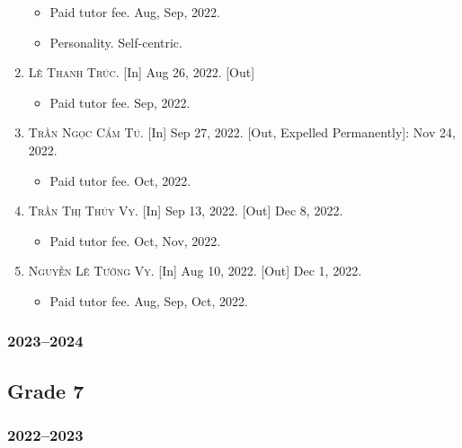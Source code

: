 \documentclass{article}
\begin{document}
\begin{enumerate}
	\begin{itemize}
		\item \textsf{Paid tutor fee.} Aug, Sep, 2022.
		\item \textsf{Personality.} Self-centric.
	\end{itemize}
	\item \textsc{Lê Thanh Trúc.} \textsf{[In]} Aug 26, 2022. \textsf{[Out]}
	\begin{itemize}
		\item \textsf{Paid tutor fee.} Sep, 2022.
	\end{itemize}
	\item \textsc{Trần Ngọc Cẩm Tú.} \textsf{[In]} Sep 27, 2022. \textsf{[Out, Expelled Permanently]}: Nov 24, 2022.
	\begin{itemize}
		\item \textsf{Paid tutor fee.} Oct, 2022.
	\end{itemize}
	\item \textsc{Trần Thị Thúy Vy.} \textsf{[In]} Sep 13, 2022. \textsf{[Out]} Dec 8, 2022.
	\begin{itemize}
		\item \textsf{Paid tutor fee.} Oct, Nov, 2022.
	\end{itemize}
	\item \textsc{Nguyễn Lê Tường Vy.} \textsf{[In]} Aug 10, 2022. \textsf{[Out]} Dec 1, 2022.
	\begin{itemize}
		\item \textsf{Paid tutor fee.} Aug, Sep, Oct, 2022.
	\end{itemize}
\end{enumerate}

\subsubsection{2023--2024}

\subsection{Grade 7}

\subsubsection{2022--2023}
\end{document}
